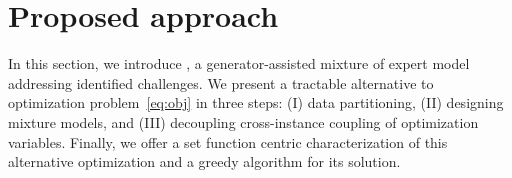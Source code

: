 \documentclass[letterpaper]{article}
\begin{document}
\section{Proposed approach}
In this section, we introduce \our, a generator-assisted mixture of expert model addressing identified challenges. We present a tractable alternative to optimization problem~\eqref{eq:obj} in three steps: (I) data partitioning, (II) designing mixture models, and (III) decoupling cross-instance coupling of optimization variables. Finally, we offer a set   function centric characterization of this alternative optimization and a greedy algorithm for its solution.





\end{document}
